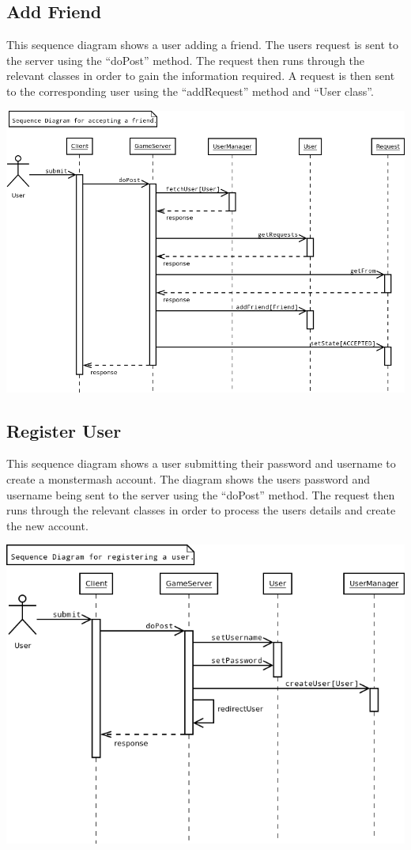 \documentclass{project}
\begin{document}
\subsection{Add Friend}
This sequence diagram shows a user adding a friend. The users request is sent to the server using the “doPost” method. The request then runs through the relevant classes in order to gain the information required. A request is then sent to the corresponding user using the “addRequest” method and “User class”.
\begin{center}
\includegraphics[scale=0.40]{SD_accept_friend.png}
\end{center}

\subsection{Register User}
This sequence diagram shows a user submitting their password and username to create a monstermash account. The diagram shows the users password and username being sent to the server using the “doPost” method. The request then runs through the relevant classes in order to process the users details and create the new account.
\begin{center}
\includegraphics[scale=0.40]{SD_register_user.png}
\end{center}
\end{document}

